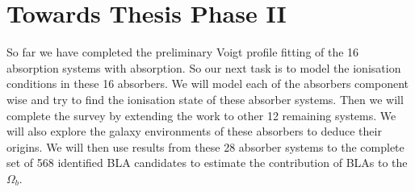 \chapter{Towards Thesis Phase II} \label{ch:Thesis-Phase-II}

So far we have completed the preliminary Voigt profile fitting of the 16 absorption systems with  absorption. So our next task is to model the ionisation conditions in these 16 absorbers. We will model each of the absorbers component wise and try to find the ionisation state of these absorber systems. Then we will complete the survey by extending the work to other 12 remaining systems. We will also explore the galaxy environments of these absorbers to deduce their origins. We will then use results from these 28 absorber systems to the complete set of 568 identified BLA candidates to estimate the contribution of BLAs to the $\Omega_b$.  